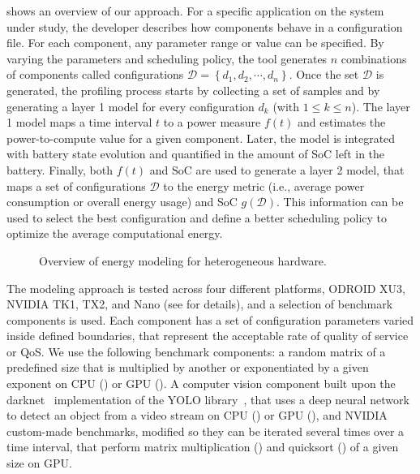  shows an overview of our approach. For a specific application on the system under study, the developer describes how components behave in a configuration file. For each component, any parameter range or value can be specified. By varying the parameters and scheduling policy, the tool generates $n$ combinations of components called configurations $\mathcal{D}=\left\{d_1,d_2,\cdots,d_{n}\right\}$. Once the set $\mathcal{D}$ is generated, the profiling process starts by collecting a set of samples and by generating a layer 1 model for every configuration $d_k$ (with $1\leq k\leq n$). The layer 1 model maps a time interval $t$ to a power measure $f(t)$ and estimates the power-to-compute value for a given component. Later, the model is integrated with battery state evolution and quantified in the amount of SoC left in the battery. Finally, both $f(t)$ and $\mathrm{SoC}$ are used to generate a layer 2 model, that maps a set of configurations $\mathcal{D}$ to the energy metric (i.e., average power consumption or overall energy usage) and SoC $g(\mathcal{D})$. This information can be used to select the best configuration and define a better scheduling policy to optimize the average computational energy.

\begin{figure}[h!]
  \centering
  \footnotesize
  
  \caption{Overview of energy modeling for heterogeneous hardware.}
  \label{fig:power-to-compute-model}
\end{figure}

The modeling approach is tested across four different platforms, ODROID XU3, NVIDIA TK1, TX2, and Nano (see  for details), and a selection of benchmark components is used. Each component has a set of configuration parameters varied inside defined boundaries, that represent the acceptable rate of quality of service or QoS. We use the following benchmark components: a random matrix of a predefined size that is multiplied by another or exponentiated by a given exponent on CPU () or GPU (). A computer vision component built upon the darknet~\citep{RA17,Red13a} implementation of the YOLO library~\citep{redmon2016you}, that uses a deep neural network to detect an object from a video stream on CPU () or GPU (), and NVIDIA custom-made benchmarks, modified so they can be iterated several times over a time interval, that perform matrix multiplication () and quicksort () of a given size on GPU.

